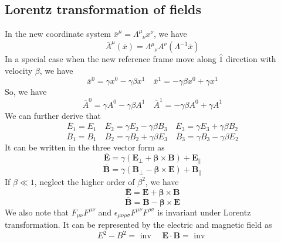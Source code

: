 \documentclass[cyan]{elegantnote}
\begin{document}
\subsection{Lorentz transformation of fields}
\noindent
In the new coordinate system $\overline{x}^{\mu} = \Lambda^{\mu}_{\phantom{\mu}\nu}x^{\nu}$, we have
\[\overline{A}^{\mu}(\overline{x}) = \Lambda^{\mu}_{\phantom{\mu}\nu}A^{\nu}(\Lambda^{-1}\overline{x})\]
In a special case when the new reference frame move along $\hat{1}$ direction with velocity $\beta$, we have
\[\overline{x}^{0} = \gamma x^0 - \gamma \beta x^1 \quad \overline{x}^{1} = -\gamma \beta x^0 + \gamma x^1\]
So, we have
\[\overline{A}^{0} = \gamma A^0 - \gamma \beta A^1 \quad \overline{A}^{1} = -\gamma \beta A^0 + \gamma A^1\]
We can further derive that
\[\overline{E}_1 = E_1 \quad \overline{E}_2 = \gamma E_2 - \gamma \beta B_3 \quad \overline{E}_3 = \gamma E_3 + \gamma \beta B_2\]
\[\overline{B}_1 = B_1 \quad \overline{B}_2 = \gamma B_2 + \gamma \beta E_3 \quad \overline{B}_3 = \gamma B_3 - \gamma \beta E_2\]
It can be written in the three vector form as
\[\bm{\overline{E}} = \gamma(\bm{E}_{\perp} + \bm{\beta} \times \bm{B}) + \bm{E}_{\parallel}\]
\[\bm{\overline{B}} = \gamma(\bm{B}_{\perp} - \bm{\beta} \times \bm{E}) + \bm{B}_{\parallel}\]
If $\beta \ll 1$, neglect the higher order of $\beta^2$, we have
\[\bm{\overline{E}} = \bm{E} + \bm{\beta} \times \bm{B}\]
\[\bm{\overline{B}} = \bm{B} - \bm{\beta} \times \bm{E}\]
We also note that $F_{\mu\nu}F^{\mu\nu}$ and $\epsilon_{\mu\nu\rho\sigma}F^{\mu\nu}F^{\rho\sigma}$ is invariant under Lorentz transformation. It can be represented by the electric and magnetic field as
\[E^2 - B^2 = \mbox{ inv } \quad \bm{E} \cdot \bm{B} = \mbox{ inv }\]
\end{document}
